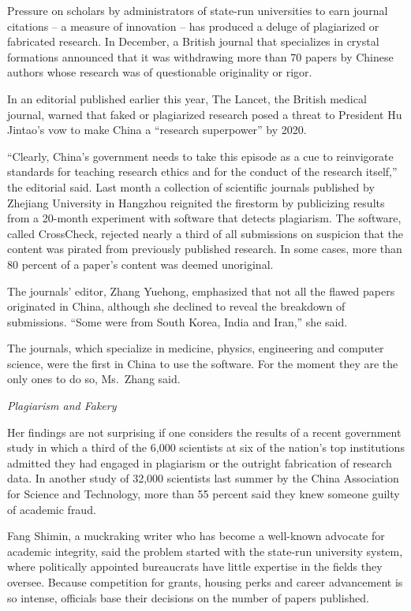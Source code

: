 ﻿\documentclass[12pt]{article}
\begin{document}
Pressure on scholars by administrators of state-run universities to earn journal citations -- a
measure of innovation -- has produced a deluge of plagiarized or fabricated research. In December, a
British journal that specializes in crystal formations announced that it was withdrawing more than
70 papers by Chinese authors whose research was of questionable originality or rigor.

In an editorial published earlier this year, The Lancet, the British medical journal, warned that
faked or plagiarized research posed a threat to President Hu Jintao's vow to make China a ``research
superpower'' by 2020.

``Clearly, China's government needs to take this episode as a cue to reinvigorate standards for
teaching research ethics and for the conduct of the research itself,'' the editorial said. Last
month a collection of scientific journals published by Zhejiang University in Hangzhou reignited the
firestorm by publicizing results from a 20-month experiment with software that detects plagiarism.
The software, called CrossCheck, rejected nearly a third of all submissions on suspicion that the
content was pirated from previously published research. In some cases, more than 80 percent of a
paper's content was deemed unoriginal.

The journals' editor, Zhang Yuehong, emphasized that not all the flawed papers originated in China,
although she declined to reveal the breakdown of submissions. ``Some were from South Korea, India
and Iran,'' she said.

The journals, which specialize in medicine, physics, engineering and computer science, were the
first in China to use the software. For the moment they are the only ones to do so, Ms.~Zhang said.

\emph{Plagiarism and Fakery}

Her findings are not surprising if one considers the results of a recent government study in which a
third of the 6,000 scientists at six of the nation's top institutions admitted they had engaged in
plagiarism or the outright fabrication of research data. In another study of 32,000 scientists last
summer by the China Association for Science and Technology, more than 55 percent said they knew
someone guilty of academic fraud.

Fang Shimin, a muckraking writer who has become a well-known advocate for academic integrity, said
the problem started with the state-run university system, where politically appointed bureaucrats
have little expertise in the fields they oversee. Because competition for grants, housing perks and
career advancement is so intense, officials base their decisions on the number of papers published.
\end{document}
